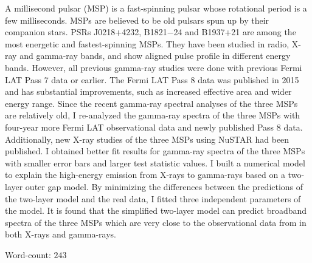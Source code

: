 \documentclass[12pt]{report}
\begin{document}
  \doublespacing
  A millisecond pulsar (MSP) is a fast-spinning pulsar whose rotational period is a few 
  milliseconds. MSPs are believed to be old pulsars spun up by their companion stars. PSRs
  J0218+4232, B1821$-$24 and B1937+21 are among the most energetic and fastest-spinning  
  MSPs. They have been studied in radio, X-ray and gamma-ray bands, and show 
  aligned pulse profile in different energy bands. However, all previous gamma-ray studies 
  were done with previous Fermi LAT Pass 7 data or earlier. The Fermi LAT Pass 8 data was 
  published in 2015 and has substantial improvements, such as increased effective area and 
  wider energy range. Since the recent gamma-ray spectral analyses of the three MSPs are 
  relatively old, I re-analyzed the gamma-ray spectra of the three MSPs with four-year more 
  Fermi LAT observational data and newly published Pass 8 data. Additionally, new X-ray 
  studies of the three MSPs using NuSTAR had been published. I obtained better fit results
  for gamma-ray spectra of the three MSPs with smaller error bars and larger test statistic 
  values. I built a numerical model to explain the high-energy emission from X-rays to 
  gamma-rays based on a two-layer outer gap model. By minimizing the differences between 
  the predictions of the two-layer model and the real data, I fitted three independent 
  parameters of the model. It is found that the simplified two-layer model can predict 
  broadband spectra of the three MSPs which are very close to the observational data from 
  in both X-rays and gamma-rays.



  \vspace{4.2cm}
  \hspace*{10cm} Word-count: $243$
  
\end{document}
